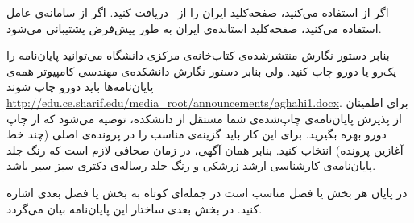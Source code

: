 	 اگر از   استفاده می‌کنید، صفحه‌کلید  ایران را از~ دریافت کنید. اگر از  سامانه‌ی عامل  استفاده می‌کنید،   صفحه‌کلید استانده‌ی ایران  به طور پیش‌فرض پشتیبانی می‌شود.
	

بنابر دستور نگارش منتشرشده‌ی کتاب‌خانه‌ی مرکزی دانشگاه می‌توانید پایان‌نامه را یک‌رو یا دورو چاپ کنید. ولی بنابر دستور نگارش دانشکده‌ی مهندسی کامپیوتر همه‌ی پایان‌نامه‌ها باید دورو چاپ شوند
{\url{http://edu.ce.sharif.edu/media_root/announcements/aghahi1.docx}}.
برای اطمینان از پذیرش پایان‌نامه‌ی چاپ‌شده‌ی شما مستقل از دانشکده، توصیه می‌شود که از چاپ دورو بهره بگیرید. برای این کار باید گزینه‌ی مناسب را در پرونده‌ی اصلی (چند خط آغازین پرونده) انتخاب کنید.
بنابر همان آگهی، در زمان صحافی لازم است که رنگ جلد پایان‌نامه‌ی کارشناسی ارشد زرشکی و رنگ جلد رساله‌ی دکتری سبز سیر باشد.

در پایان هر بخش یا فصل مناسب است در جمله‌ای کوتاه به بخش یا فصل بعدی اشاره کنید. در بخش بعدی ساختار این پایان‌نامه بیان می‌گردد.
